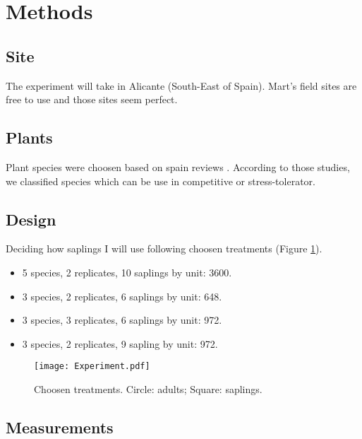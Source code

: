 \documentclass[12pt]{article} %
\begin{document}
\section{Methods}

\subsection{Site}

The experiment will take in Alicante (South-East of Spain). Mart's field sites are free to use and those sites seem perfect.

\subsection{Plants}

Plant species were choosen based on spain reviews \citep{McCluney2012,Navarro2006, Jauffret2003}. According to those studies, we classified species which can be use in competitive or stress-tolerator.



\subsection{Design}

Deciding how saplings I will use following choosen treatments (Figure \ref{exp}).

\begin{itemize}
\item 5 species, 2 replicates, 10 saplings by unit: 3600.
\item 3 species, 2 replicates, 6 saplings by unit: 648.
\item 3 species, 3 replicates, 6 saplings by unit: 972.
\item 3 species, 2 replicates, 9 sapling by unit: 972.
\end{itemize}


\begin{figure} %
\begin{center}
\texttt{[image: Experiment.pdf]}
\end{center}
\caption{Choosen treatments. Circle: adults; Square: saplings. \label{exp}}
\end{figure}


\subsection{Measurements}
\end{document}
